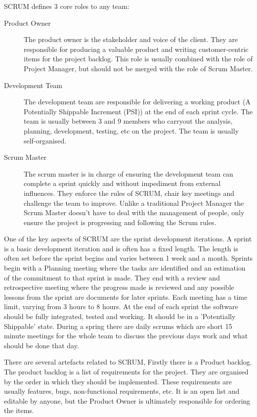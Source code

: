 \documentclass[11pt,a4paper]{article}
\begin{document}
SCRUM defines 3 core roles to any team:

\begin{description}
\item[Product Owner] The product owner is the stakeholder and voice of the client. They are responsible for producing a valuable product and writing customer-centric items for the project backlog. This role is usually combined with the role of Project Manager, but should not be merged with the role of Scrum Master. 
\item[Development Team] The development team are responsible for delivering a working product (A Potentially Shippable Increment (PSI)) at the end of each sprint cycle. The team is usually between 3 and 9 members who carryout the analysis, planning, development, testing, etc on the project. The team is usually self-organised.
\item[Scrum Master] The scrum master is in charge of ensuring the development team can complete a sprint quickly and without impediment from external influences. They enforce the rules of SCRUM, chair key meetings and challenge the team to improve. Unlike a traditional Project Manager the Scrum Master doesn't have to deal with the management of people, only ensure the project is progressing and following the Scrum rules. 
\end{description}

One of the key aspects of SCRUM are the sprint development iterations. A sprint is a basic development iteration and is often has a fixed length. The length is often set before the sprint begins and varies between 1 week and a month. Sprints begin with a Planning meeting where the tasks are identified and an estimation of the commitment to that sprint is made. They end with a  review and retrospective meeting where the progress made is reviewed and any possible lessons from the sprint are documents for later sprints. Each meeting has a time limit, varying from 3 hours to 8 hours. At the end of each sprint the software should be fully integrated, tested and working. It should be in a 'Potentially Shippable' state. During a spring there are daily scrums which are short 15 minute meetings for the whole team to discuss the previous days work and what should be done that day. 

There are several artefacts related to SCRUM, Firstly there is a Product backlog. The product backlog is a list of requirements for the project. They are organised by the order in which they should be implemented. These requirements are usually features, bugs, non-functional requirements, etc. It is an open list and editable by anyone, but the Product Owner is ultimately responsible for ordering the items. 
\end{document}
